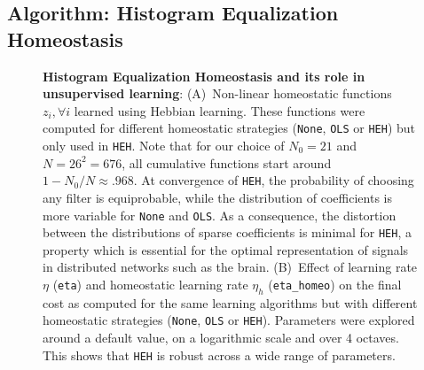 \documentclass[vision,article,submit,oneauthor,pdftex]{Definitions/mdpi}
\newcommand{\seeFig}[1]{Figure~\ref{fig:#1}}%
\begin{document}
\subsection{Algorithm: Histogram Equalization Homeostasis}\label{HEH}
\begin{figure}%
\caption{
{\bf Histogram Equalization Homeostasis and its role in unsupervised learning}:
{\sf (A)}~Non-linear homeostatic functions $z_i, \forall i$ learned using Hebbian learning. These functions were computed for different homeostatic strategies (\texttt{None}, \texttt{OLS} or \texttt{HEH}) but only used in \texttt{HEH}. Note that for our choice of $N_0=21$ and $N=26^2=676$, all cumulative functions start around $1 - N_0/N \approx .968 $. At convergence of \texttt{HEH}, the probability of choosing any filter is equiprobable, while the distribution of coefficients is more variable for \texttt{None} and \texttt{OLS}. As a consequence, the distortion between the distributions of sparse coefficients is minimal for \texttt{HEH}, a property which is essential for the optimal representation of signals in distributed networks such as the brain. %
{\sf (B)}~Effect of learning rate $\eta$ (\texttt{eta}) and homeostatic learning rate $\eta_h$ (\texttt{eta\_homeo}) on the final cost as computed for the same learning algorithms but with different homeostatic strategies (\texttt{None}, \texttt{OLS} or \texttt{HEH}). Parameters were explored around a default value, on a logarithmic scale and over 4 octaves. This shows that \texttt{HEH} is robust across a wide range of parameters.
}
\end{figure}
\end{document}
